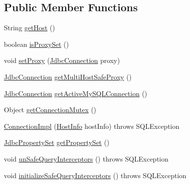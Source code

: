 \subsection*{Public Member Functions}
\begin{DoxyCompactItemize}
\item 
String \mbox{\hyperlink{classcom_1_1mysql_1_1cj_1_1jdbc_1_1_connection_impl_a2f4788ba10e12dfcced8972989aa44d4}{get\+Host}} ()
\item 
boolean \mbox{\hyperlink{classcom_1_1mysql_1_1cj_1_1jdbc_1_1_connection_impl_aedabb7228489905f7f53a433e5597133}{is\+Proxy\+Set}} ()
\item 
void \mbox{\hyperlink{classcom_1_1mysql_1_1cj_1_1jdbc_1_1_connection_impl_a2fd722cbf9248f2d11b194cd5a91441f}{set\+Proxy}} (\mbox{\hyperlink{interfacecom_1_1mysql_1_1cj_1_1jdbc_1_1_jdbc_connection}{Jdbc\+Connection}} proxy)
\item 
\mbox{\hyperlink{interfacecom_1_1mysql_1_1cj_1_1jdbc_1_1_jdbc_connection}{Jdbc\+Connection}} \mbox{\hyperlink{classcom_1_1mysql_1_1cj_1_1jdbc_1_1_connection_impl_af8f366cfa07f84c942f9f73f22dba006}{get\+Multi\+Host\+Safe\+Proxy}} ()
\item 
\mbox{\hyperlink{interfacecom_1_1mysql_1_1cj_1_1jdbc_1_1_jdbc_connection}{Jdbc\+Connection}} \mbox{\hyperlink{classcom_1_1mysql_1_1cj_1_1jdbc_1_1_connection_impl_acc626e9289e8a7591bf56f0df92f4ef1}{get\+Active\+My\+S\+Q\+L\+Connection}} ()
\item 
Object \mbox{\hyperlink{classcom_1_1mysql_1_1cj_1_1jdbc_1_1_connection_impl_a2d5f7dcbb793d20fce3c805a2ad96b80}{get\+Connection\+Mutex}} ()
\item 
\mbox{\hyperlink{classcom_1_1mysql_1_1cj_1_1jdbc_1_1_connection_impl_a821f9640583d1b2daea0424f3b0ea945}{Connection\+Impl}} (\mbox{\hyperlink{classcom_1_1mysql_1_1cj_1_1conf_1_1_host_info}{Host\+Info}} host\+Info)  throws S\+Q\+L\+Exception 
\item 
\mbox{\hyperlink{interfacecom_1_1mysql_1_1cj_1_1jdbc_1_1_jdbc_property_set}{Jdbc\+Property\+Set}} \mbox{\hyperlink{classcom_1_1mysql_1_1cj_1_1jdbc_1_1_connection_impl_a46dbc5cd68d7e3bd2ba1931c4bd5f003}{get\+Property\+Set}} ()
\item 
void \mbox{\hyperlink{classcom_1_1mysql_1_1cj_1_1jdbc_1_1_connection_impl_a2d9f577e4a6ccc254081ce8dfd9a3bd8}{un\+Safe\+Query\+Interceptors}} ()  throws S\+Q\+L\+Exception 
\item 
void \mbox{\hyperlink{classcom_1_1mysql_1_1cj_1_1jdbc_1_1_connection_impl_a0f81e64aaf07263998dc13d5455e7513}{initialize\+Safe\+Query\+Interceptors}} ()  throws S\+Q\+L\+Exception 

\end{DoxyCompactItemize}
